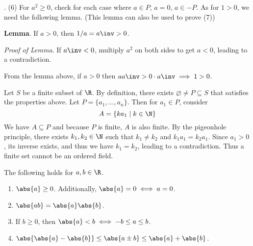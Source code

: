 \medskip

\noindent \pf. (6) For \(a^2 \geq 0\), check for each case where \(a \in P\), \(a = 0\), \(a \in -P\). As for \(1 > 0\), we need the following lemma. (This lemma can also be used to prove (7))

\medskip

\noindent \textbf{Lemma}. If \(a > 0\), then \(1/a = a\inv > 0\).

\noindent \textit{Proof of Lemma}. If \(a\inv < 0\), multiply \(a^2\) on both sides to get \(a < 0\), leading to a contradiction.

\medskip

\noindent From the lemma above, if \(a > 0\) then \(a a\inv > 0 \cdot a\inv \implies 1 > 0\).

\bigskip

\noindent {} Let \(S\) be a finite subset of \(\R\). By definition, there exists \(\varnothing \neq P \subseteq S\) that satisfies the properties above. Let \(P = \{a_1, \dots, a_n\}\). Then for \(a_1 \in P\), consider
\[
    A = \{ka_1 \mid k \in \N \}
\]
We have \(A \subseteq P\) and because \(P\) is finite, \(A\) is also finite. By the pigeonhole principle, there exists \(k_1, k_2 \in \N\) such that \(k_1 \neq k_2\) and \(k_1a_1 = k_2a_1\). Since \(a_1 > 0\), its inverse exists, and thus we have \(k_1 = k_2\), leading to a contradiction. Thus a finite set cannot be an ordered field.

\bigskip

\noindent {} The following holds for \(a, b \in \R\).
\begin{enumerate}
    \item \(\abs{a} \geq 0\). Additionally, \(\abs{a} = 0 \iff a = 0\).
    \item \(\abs{ab} = \abs{a}\abs{b}\).
    \item If \(b \geq 0\), then \(\abs{a} < b \iff -b \leq a \leq b\).
    \item \(\abs{\abs{a} - \abs{b}} \leq \abs{a \pm b} \leq \abs{a} + \abs{b}\).
\end{enumerate}

\clearpage
